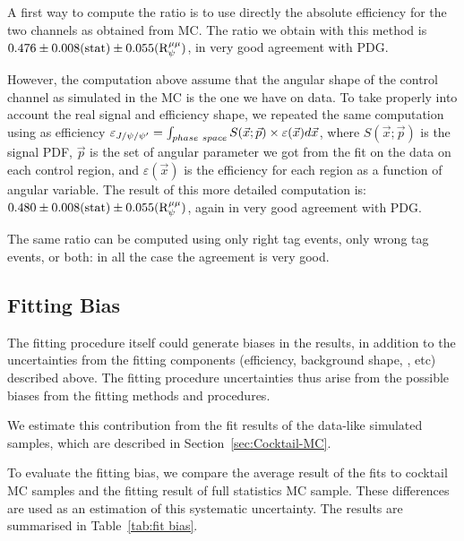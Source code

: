 A first way to compute the ratio is to use directly the absolute efficiency for the two channels as obtained from MC.
The ratio we obtain with this method is $0.476\pm 0.008({\rm stat}) \pm 0.055({\rm R}_{\psi}^{\mu\mu})$, in very good agreement with PDG.

However, the computation above assume that the angular shape of the control channel as simulated in the MC is the one we have on data.
To take properly into account the real signal and efficiency shape, we repeated the same computation using as efficiency $\varepsilon_{J/\psi/\psi'}=\int_{phase~space}S(\vec{x};\vec{p})\times\varepsilon(\vec{x})d\vec{x}$, where $S(\vec{x};\vec{p})$ is the signal PDF, $\vec{p}$ is the set of angular parameter we got from the fit on the data on each control region, and $\varepsilon(\vec{x})$ is the efficiency for each region as a function of angular variable.
The result of this more detailed computation is: $0.480\pm 0.008({\rm stat}) \pm 0.055({\rm R}_{\psi}^{\mu\mu})$, again in very good agreement with PDG.

The same ratio can be computed using only right tag events, only wrong tag events, or both: in all the case the agreement is very good.

\subsection{Fitting Bias}
\label{sec:fitbias-syst}

The fitting procedure itself could generate biases in the results, in addition to the uncertainties from the fitting components (efficiency, background shape, \pdf, etc) described above.
The fitting procedure uncertainties thus arise from the possible biases from the fitting methods and procedures.

We estimate this contribution from the fit results of the data-like simulated samples, which are described in Section~\ref{sec:Cocktail-MC}.

To evaluate the fitting bias, we compare the average result of the fits to cocktail MC samples and the fitting result of full statistics MC sample.
These differences are used as an estimation of this systematic uncertainty.
The results are summarised in Table~\ref{tab:fit bias}.


